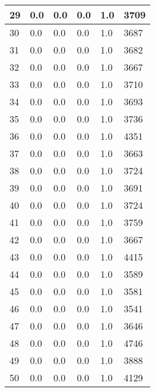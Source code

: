 \begin{longtable}{|l|l|l|l|l|l|}
29 & 0.0 & 0.0 & 0.0 & 1.0 & 3709 \\ \hline 
30 & 0.0 & 0.0 & 0.0 & 1.0 & 3687 \\ \hline 
31 & 0.0 & 0.0 & 0.0 & 1.0 & 3682 \\ \hline 
32 & 0.0 & 0.0 & 0.0 & 1.0 & 3667 \\ \hline 
33 & 0.0 & 0.0 & 0.0 & 1.0 & 3710 \\ \hline 
34 & 0.0 & 0.0 & 0.0 & 1.0 & 3693 \\ \hline 
35 & 0.0 & 0.0 & 0.0 & 1.0 & 3736 \\ \hline 
36 & 0.0 & 0.0 & 0.0 & 1.0 & 4351 \\ \hline 
37 & 0.0 & 0.0 & 0.0 & 1.0 & 3663 \\ \hline 
38 & 0.0 & 0.0 & 0.0 & 1.0 & 3724 \\ \hline 
39 & 0.0 & 0.0 & 0.0 & 1.0 & 3691 \\ \hline 
40 & 0.0 & 0.0 & 0.0 & 1.0 & 3724 \\ \hline 
41 & 0.0 & 0.0 & 0.0 & 1.0 & 3759 \\ \hline 
42 & 0.0 & 0.0 & 0.0 & 1.0 & 3667 \\ \hline 
43 & 0.0 & 0.0 & 0.0 & 1.0 & 4415 \\ \hline 
44 & 0.0 & 0.0 & 0.0 & 1.0 & 3589 \\ \hline 
45 & 0.0 & 0.0 & 0.0 & 1.0 & 3581 \\ \hline 
46 & 0.0 & 0.0 & 0.0 & 1.0 & 3541 \\ \hline 
47 & 0.0 & 0.0 & 0.0 & 1.0 & 3646 \\ \hline 
48 & 0.0 & 0.0 & 0.0 & 1.0 & 4746 \\ \hline 
49 & 0.0 & 0.0 & 0.0 & 1.0 & 3888 \\ \hline 
50 & 0.0 & 0.0 & 0.0 & 1.0 & 4129 \\ \hline 
\end{longtable}